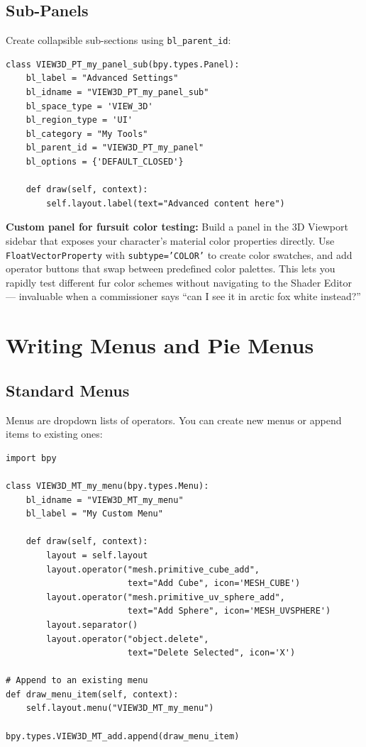 \subsection{Sub-Panels}

Create collapsible sub-sections using \texttt{bl\_parent\_id}:

\begin{lstlisting}
class VIEW3D_PT_my_panel_sub(bpy.types.Panel):
    bl_label = "Advanced Settings"
    bl_idname = "VIEW3D_PT_my_panel_sub"
    bl_space_type = 'VIEW_3D'
    bl_region_type = 'UI'
    bl_category = "My Tools"
    bl_parent_id = "VIEW3D_PT_my_panel"
    bl_options = {'DEFAULT_CLOSED'}

    def draw(self, context):
        self.layout.label(text="Advanced content here")
\end{lstlisting}

\begin{furrybox}
\textbf{Custom panel for fursuit color testing:} Build a panel in the 3D Viewport sidebar that exposes your character's material color properties directly. Use \texttt{FloatVectorProperty} with \texttt{subtype='COLOR'} to create color swatches, and add operator buttons that swap between predefined color palettes. This lets you rapidly test different fur color schemes without navigating to the Shader Editor --- invaluable when a commissioner says ``can I see it in arctic fox white instead?''
\end{furrybox}


\section{Writing Menus and Pie Menus}
\label{sec:scripting-menus}

\subsection{Standard Menus}

Menus are dropdown lists of operators. You can create new menus or append items to existing ones:

\begin{lstlisting}
import bpy

class VIEW3D_MT_my_menu(bpy.types.Menu):
    bl_idname = "VIEW3D_MT_my_menu"
    bl_label = "My Custom Menu"

    def draw(self, context):
        layout = self.layout
        layout.operator("mesh.primitive_cube_add",
                        text="Add Cube", icon='MESH_CUBE')
        layout.operator("mesh.primitive_uv_sphere_add",
                        text="Add Sphere", icon='MESH_UVSPHERE')
        layout.separator()
        layout.operator("object.delete",
                        text="Delete Selected", icon='X')

# Append to an existing menu
def draw_menu_item(self, context):
    self.layout.menu("VIEW3D_MT_my_menu")

bpy.types.VIEW3D_MT_add.append(draw_menu_item)
\end{lstlisting}

